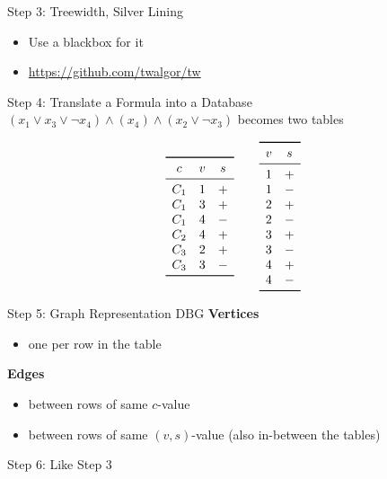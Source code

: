 \documentclass[]{beamer}
\newcommand{\DBG}{\mathrm{DBG}}
\begin{document}
\begin{frame}{Step 3: Treewidth, Silver Lining}
\begin{itemize}
	\item Use a blackbox for it
	\item \url{https://github.com/twalgor/tw}
\end{itemize}
\end{frame}

\begin{frame}{Step 4: Translate a Formula into a Database}
$(x_1\lor x_3\lor \lnot x_4)\land (x_4)\land (x_2\lor \lnot x_3)$ becomes two tables

$$\begin{array}{ccc}\toprule
		c & v & s \\\midrule
		C_1 & 1 & +\\
		C_1 & 3 & +\\
		C_1 & 4 &-\\
		C_2 & 4 &+\\
		C_3 & 2 &+\\
		C_3 & 3 &-\\\bottomrule
\end{array}\qquad
\begin{array}{cc}\toprule
		v & s \\\midrule
		1 &+\\
		1 &-\\
		2 &+\\
		2 &-\\
		3 &+\\
		3 &-\\
		4 &+\\
		4 &-	\\\bottomrule
\end{array}
$$

\end{frame}

\begin{frame}{Step 5: Graph Representation $\DBG$}
\textbf{Vertices}
\begin{itemize}
	\item one per row in the table
\end{itemize}\bigskip

\textbf{Edges}
\begin{itemize}
	\item between rows of same $c$-value
	\item between rows of same $(v,s)$-value (also in-between the tables)
\end{itemize}

\alert{Step 6:} Like Step 3
\end{frame}
\end{document}

